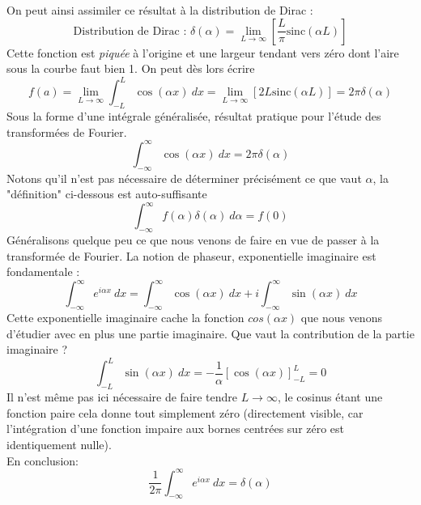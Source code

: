 On peut ainsi assimiler ce résultat à la distribution de Dirac :
\begin{equation}
\text{Distribution de Dirac : } \delta(\alpha) = \lim\limits_{L\rightarrow\infty}\left[
\dfrac{L}{\pi}\text{sinc}(\alpha L)\right]
\end{equation}
Cette fonction est \textit{piquée} à l’origine et une largeur tendant vers zéro dont l'aire
sous la courbe faut bien 1. On peut dès lors écrire
\begin{equation}
f(a) = \lim\limits_{L\rightarrow\infty} \int_{-L}^L \cos(\alpha x)\ dx = \lim\limits_{L 
\rightarrow \infty}[2L\text{sinc}(\alpha L)] = 2\pi \delta(\alpha)
\end{equation}
Sous la forme d'une intégrale généralisée, résultat pratique pour l'étude des transformées 
de Fourier.
\begin{equation}
\int_{-\infty}^\infty \cos(\alpha x)\ dx = 2\pi \delta (\alpha)
\end{equation}
Notons qu'il n'est pas nécessaire de déterminer précisément ce que vaut $\alpha$, la 
"définition" ci-dessous est auto-suffisante
\begin{equation}
\int_{-\infty}^\infty f(\alpha)\delta(\alpha)\ d\alpha = f(0)
\end{equation}
Généralisons quelque peu ce que nous venons de faire en vue de passer à la transformée de 
Fourier. La notion de phaseur, exponentielle imaginaire est fondamentale :
\begin{equation}
\int_{-\infty}^\infty e^{i\alpha x}\ dx = \int_{-\infty}^\infty \cos(\alpha x)\ dx + i
\int_{-\infty}^\infty \sin(\alpha x)\ dx
\end{equation}
Cette exponentielle imaginaire cache la fonction $cos(\alpha x)$ que nous venons d'étudier 
avec en plus une partie imaginaire. Que vaut la contribution de la partie imaginaire ? 
\begin{equation}
\int_{-L}^L \sin(\alpha x)\ dx = -\frac{1}{\alpha}\left[\cos(\alpha x)\right]^L_{-L} = 0
\end{equation}
Il n'est même pas ici nécessaire de faire tendre $L\rightarrow\infty$, le cosinus étant 
une fonction paire cela donne tout simplement zéro (directement visible, car l'intégration 
d'une fonction impaire aux bornes centrées sur zéro est identiquement nulle). \\
En conclusion:
\begin{equation}
\dfrac{1}{2\pi}\int_{-\infty}^\infty e^{i\alpha x}\ dx  = \delta(\alpha)
\end{equation}

